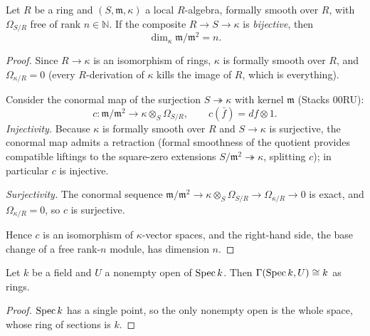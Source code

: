 \begin{theorem}
  \label{pa-thm:cotangent_finrank_rational}
  \leanok

  Let \(R\) be a ring and \((S, \mathfrak m, \kappa)\) a local \(R\)-algebra,
  formally smooth over \(R\), with \(\Omega_{S/R}\) free of rank
  \(n \in \mathbb{N}\). If the composite \(R \to S \to \kappa\) is
  \emph{bijective}, then
  \[
    \dim_\kappa \mathfrak m/\mathfrak m^2 = n .
  \]
\end{theorem}
\begin{proof}
  \leanok
  Since \(R \to \kappa\) is an isomorphism of rings, \(\kappa\) is formally
  smooth over \(R\), and \(\Omega_{\kappa/R} = 0\) (every \(R\)-derivation of
  \(\kappa\) kills the image of \(R\), which is everything).

  Consider the conormal map of the surjection \(S \twoheadrightarrow \kappa\)
  with kernel \(\mathfrak m\) (Stacks 00RU):
  \[
    c : \mathfrak m/\mathfrak m^2 \longrightarrow
    \kappa \otimes_S \Omega_{S/R},
    \qquad c(\bar f) = df \otimes 1 .
  \]
  \emph{Injectivity.} Because \(\kappa\) is formally smooth over \(R\) and
  \(S \to \kappa\) is surjective, the conormal map admits a retraction (formal
  smoothness of the quotient provides compatible liftings to the square-zero
  extensions \(S/\mathfrak m^2 \twoheadrightarrow \kappa\), splitting \(c\));
  in particular \(c\) is injective.

  \emph{Surjectivity.} The conormal sequence
  \(\mathfrak m/\mathfrak m^2 \to \kappa \otimes_S \Omega_{S/R} \to
  \Omega_{\kappa/R} \to 0\) is exact, and \(\Omega_{\kappa/R} = 0\), so \(c\)
  is surjective.

  Hence \(c\) is an isomorphism of \(\kappa\)-vector spaces, and the right-hand
  side, the base change of a free rank-\(n\) module, has dimension \(n\).
\end{proof}

\begin{lemma}
  \label{pa-lem:gamma_spec_field}
  \leanok

  Let \(k\) be a field and \(U\) a nonempty open of \(\operatorname{Spec} k\). Then
  \(\Gamma(\operatorname{Spec} k, U) \cong k\) as rings.
\end{lemma}
\begin{proof}
  \leanok
  \(\operatorname{Spec} k\) has a single point, so the only nonempty open is the whole space,
  whose ring of sections is \(k\).
\end{proof}

